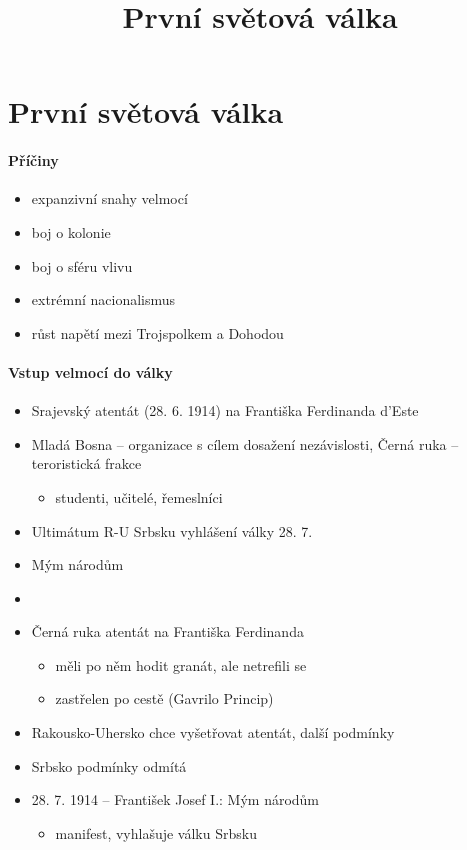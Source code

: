 \title{První světová válka}




\section{První světová válka}
\paragraph{Příčiny}
\begin{itemize}
\item expanzivní snahy velmocí
\item boj o kolonie
\item boj o sféru vlivu
\item extrémní nacionalismus
\item růst napětí mezi Trojspolkem a Dohodou
\end{itemize}

\paragraph{Vstup velmocí do války}
\begin{itemize}
\item Srajevský atentát (28. 6. 1914) na Františka Ferdinanda d'Este
\item Mladá Bosna -- organizace s cílem dosažení nezávislosti, Černá ruka -- teroristická frakce
	\begin{itemize}
	\item studenti, učitelé, řemeslníci
	\end{itemize}
\item Ultimátum R-U Srbsku \ra vyhlášení války 28. 7.
\item Mým národům
\item {}
\item Černá ruka \ra atentát na Františka Ferdinanda
	\begin{itemize}
	\item měli po něm hodit granát, ale netrefili se
	\item zastřelen po cestě (Gavrilo Princip)
	\end{itemize}
\item Rakousko-Uhersko chce vyšetřovat atentát, další podmínky
\item Srbsko podmínky odmítá
\item 28. 7. 1914 -- František Josef I.: Mým národům
	\begin{itemize}
	\item manifest, vyhlašuje válku Srbsku
	\end{itemize}
\end{itemize}


